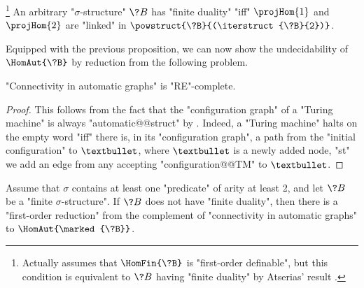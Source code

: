 \begin{proposition}%
	\!\footnote{Actually \cite[Theorem 4.7]{LaroseLotenTardif2007CharacterisationFOCSP} assumes
	that $\HomFin{\?B}$ is "first-order definable", but this condition
	is equivalent to $\?B$ having "finite duality" by Atserias' result
	\cite[Corollary 4]{Atserias2008DigraphColoring}.}%
	\AP\label{prop:characterization-finite-duality-path-projections}
	An arbitrary "$\sigma$-structure" $\?B$ has "finite duality" "iff"
	$\projHom{1}$ and $\projHom{2}$ are "linked" in $\powstruct{\?B}{(\iterstruct{\?B}{2})}$.
\end{proposition}

Equipped with the previous proposition, we can now show the undecidability 
of $\HomAut{\?B}$ by reduction from the following problem.

\begin{property}
	\AP\label{prop:undecidability-connectivity}
	"Connectivity in automatic graphs" is "RE"-complete.
\end{property}

\begin{proof}
	This follows from the fact that the "configuration graph" of
	a "Turing machine" is always "automatic@@struct" by .
	Indeed, a "Turing machine" halts on the empty word "iff" there is, in its
	"configuration graph", a path from the "initial configuration"
	to $\textbullet$, where $\textbullet$ is a newly added node,
	"st" we add an edge from any accepting "configuration@@TM" to $\textbullet$. 
\end{proof}

\begin{lemma}
	\AP\label{lem:reduction-hom}
	Assume that $\sigma$ contains at least one "predicate" of arity at least 2,
	and let $\?B$ be a "finite $\sigma$-structure".
	If $\?B$ does not have "finite duality", then there is a "first-order reduction" 
	from the complement of "connectivity in automatic graphs" to $\HomAut{\marked{\?B}}$.
\end{lemma}

